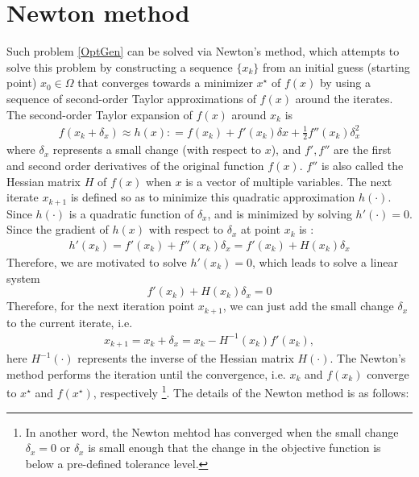 \section{Newton method}
Such problem \ref{OptGen} can be solved via Newton's method, which attempts to solve this problem by constructing a sequence $\{x_k\}$ from an initial guess (starting point) $x_0 \in \Omega$ that converges towards a minimizer $x^\star$ of $f(x)$  by using a sequence of second-order Taylor approximations of $f(x)$ around the iterates. The second-order Taylor expansion of $f(x)$ around $x_k$ is
\begin{align*}
f(x_k + \delta_x) \approx h(x) : = f(x_k) + f'(x_k)\delta x +\frac{1}{2}f''(x_k)\delta_x^2 
\end{align*}
where $\delta_x$ represents a small change (with respect to $x$), and $f', f''$ are the first and second order derivatives of the original function $f(x)$. $f''$ is also called the Hessian matrix $H$ of $f(x)$ when $x$ is a vector of multiple variables. The next iterate $x_{k+1}$ is defined so as to minimize this quadratic approximation $h(\cdot)$. Since $h(\cdot)$ is a quadratic function of $\delta_x$, and is minimized by solving $h'(\cdot) = 0$. Since the gradient of $h(x)$ with respect to $\delta_x$ at point $x_k$ is :
\begin{align*}
h'(x_k) = f'(x_k) +f''(x_k)\delta_x = f'(x_k) +H(x_k)\delta_x
\end{align*}
Therefore, we are motivated to solve $h'(x_k) =0$, which leads to solve a linear system
\begin{equation}
	f'(x_k) +H(x_k)\delta_x =0
	\label{HessianEq}
\end{equation}
Therefore, for the next iteration point $x_{k+1}$, we can just add the small change $\delta_x$ to the current iterate, i.e. 
\begin{align*}
	x_{k+1}  = x_k + \delta_x = x_k - H^{-1}(x_k)f'(x_k), 
\end{align*}
here $ H^{-1}(\cdot)$ represents the inverse of the Hessian matrix $H(\cdot)$. The Newton's method performs the iteration until the convergence, i.e. $x_k$ and $f(x_k)$ converge to $x^\star$ and $f(x^\star)$, respectively \footnote{In another word, the Newton mehtod has converged when the small change $\delta_x =0$ or $\delta_x$ is small enough that the change in the objective function is below a pre-defined tolerance level.}. The details of the Newton method is as follows: 
